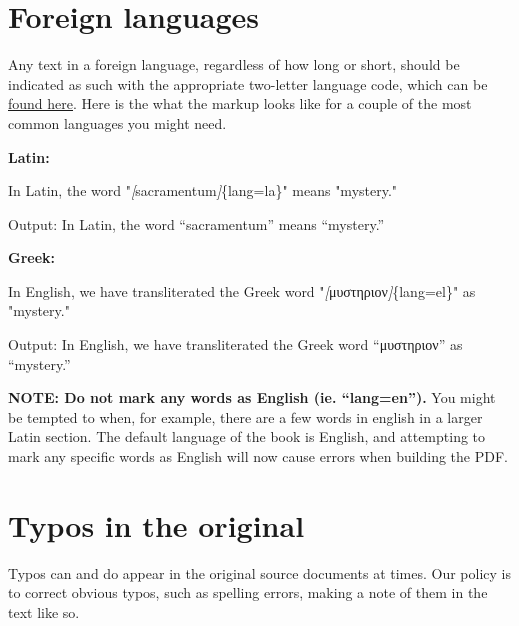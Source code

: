 \documentclass[
]{book}
\newenvironment{Shaded}{\begin{snugshade}}{\end{snugshade}}
\newcommand{\CommentTok}[1]{\textcolor[rgb]{0.56,0.35,0.01}{\textit{#1}}}
\newcommand{\NormalTok}[1]{#1}
\newcommand{\OtherTok}[1]{\textcolor[rgb]{0.56,0.35,0.01}{#1}}
\begin{document}
\hypertarget{foreign-languages}{%
\chapter{Foreign languages}\label{foreign-languages}}

Any text in a foreign language, regardless of how long or short, should be indicated as such with the appropriate two-letter language code, which can be \href{https://www.w3schools.com/tags/ref_language_codes.asp}{found here}. Here is the what the markup looks like for a couple of the most common languages you might need.

\textbf{Latin:}

\begin{Shaded}
\begin{Highlighting}[]
\NormalTok{In Latin, the word "}\CommentTok{[}\OtherTok{sacramentum}\CommentTok{]}\NormalTok{\{lang=la\}" means "mystery."}
\end{Highlighting}
\end{Shaded}

Output: In Latin, the word ``\foreignlanguage{latin}{sacramentum}'' means ``mystery.''

\textbf{Greek:}

\begin{Shaded}
\begin{Highlighting}[]
\NormalTok{In English, we have transliterated the Greek word "}\CommentTok{[}\OtherTok{μυστηριον}\CommentTok{]}\NormalTok{\{lang=el\}" as "mystery."}
\end{Highlighting}
\end{Shaded}

Output: In English, we have transliterated the Greek word ``\foreignlanguage{greek}{μυστηριον}'' as ``mystery.''

\textbf{NOTE: Do not mark any words as English (ie. ``lang=en'').} You might be tempted to when, for example, there are a few words in english in a larger Latin section. The default language of the book is English, and attempting to mark any specific words as English will now cause errors when building the PDF.

\hypertarget{typos-in-the-original}{%
\chapter{Typos in the original}\label{typos-in-the-original}}

Typos can and do appear in the original source documents at times. Our policy is to correct obvious typos, such as spelling errors, making a note of them in the text like so.
\end{document}

